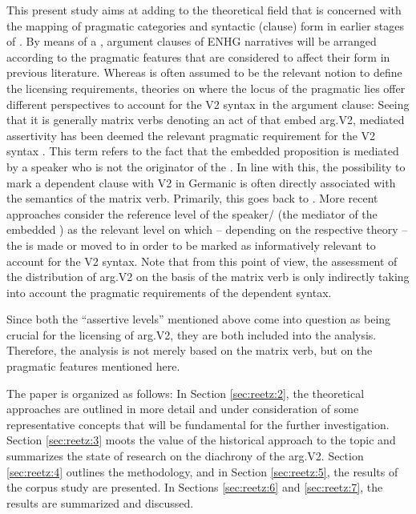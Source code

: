 \documentclass[output=paper,colorlinks,citecolor=brown]{langscibook}
\begin{document}
This present study aims at adding to the theoretical field that is concerned with the mapping of pragmatic categories and syntactic (clause) form in earlier stages of . By means of a , argument clauses of ENHG narratives will be arranged according to the pragmatic features that are considered to affect their form in previous literature. Whereas  is often assumed to be the relevant notion to define the licensing requirements, theories on where the locus of the pragmatic  lies offer different perspectives to account for the V2 syntax in the argument clause: Seeing that it is generally matrix verbs denoting an act of  that embed arg.V2, mediated assertivity has been deemed the relevant pragmatic requirement for the V2 syntax \citep{Reis1997, Gärtner2002}. This term refers to the fact that the embedded proposition is mediated by a speaker who is not the originator of the . In line with this, the possibility to mark a dependent clause with V2 in Germanic is often directly associated with the semantics of the matrix verb. Primarily, this goes back to \citet{HooperHooper1973}. More recent approaches consider the reference level of the speaker/ (the mediator of the embedded ) as the relevant level on which – depending on the respective theory – the  is made \citep{Meinunger2006} or moved to in order to be marked as informatively relevant  \citep{Djärv2022} to account for the V2 syntax. Note that from this point of view, the assessment of the distribution of arg.V2 on the basis of the matrix verb is only indirectly taking into account the pragmatic requirements of the dependent syntax.

Since both the “assertive levels” mentioned above come into question as being crucial for the licensing of arg.V2, they are both included into the analysis. Therefore, the analysis is not merely based on the matrix verb, but on the pragmatic features mentioned here.

The paper is organized as follows: In Section \ref{sec:reetz:2}, the theoretical approaches are outlined in more detail and under consideration of some representative concepts that will be fundamental for the further investigation. Section \ref{sec:reetz:3} moots the value of the historical approach to the topic and summarizes the state of research on the diachrony of the arg.V2. Section \ref{sec:reetz:4} outlines the methodology, and in Section \ref{sec:reetz:5}, the results of the corpus study are presented. In Sections \ref{sec:reetz:6} and \ref{sec:reetz:7}, the results are summarized and discussed. 
\end{document}
